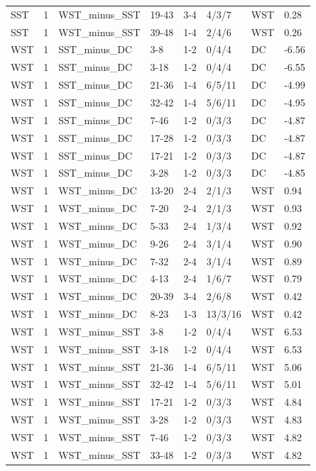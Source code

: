 \begin{table}[!h]
\begin{tabular}[t]{lrllllll}
SST & 1 & WST_minus_SST & 19-43 & 3-4 & 4/3/7 & WST & 0.28\\
SST & 1 & WST_minus_SST & 39-48 & 1-4 & 2/4/6 & WST & 0.26\\
WST & 1 & SST_minus_DC & 3-8 & 1-2 & 0/4/4 & DC & -6.56\\
\addlinespace
WST & 1 & SST_minus_DC & 3-18 & 1-2 & 0/4/4 & DC & -6.55\\
WST & 1 & SST_minus_DC & 21-36 & 1-4 & 6/5/11 & DC & -4.99\\
WST & 1 & SST_minus_DC & 32-42 & 1-4 & 5/6/11 & DC & -4.95\\
WST & 1 & SST_minus_DC & 7-46 & 1-2 & 0/3/3 & DC & -4.87\\
WST & 1 & SST_minus_DC & 17-28 & 1-2 & 0/3/3 & DC & -4.87\\
\addlinespace
WST & 1 & SST_minus_DC & 17-21 & 1-2 & 0/3/3 & DC & -4.87\\
WST & 1 & SST_minus_DC & 3-28 & 1-2 & 0/3/3 & DC & -4.85\\
WST & 1 & WST_minus_DC & 13-20 & 2-4 & 2/1/3 & WST & 0.94\\
WST & 1 & WST_minus_DC & 7-20 & 2-4 & 2/1/3 & WST & 0.93\\
WST & 1 & WST_minus_DC & 5-33 & 2-4 & 1/3/4 & WST & 0.92\\
\addlinespace
WST & 1 & WST_minus_DC & 9-26 & 2-4 & 3/1/4 & WST & 0.90\\
WST & 1 & WST_minus_DC & 7-32 & 2-4 & 3/1/4 & WST & 0.89\\
WST & 1 & WST_minus_DC & 4-13 & 2-4 & 1/6/7 & WST & 0.79\\
WST & 1 & WST_minus_DC & 20-39 & 3-4 & 2/6/8 & WST & 0.42\\
WST & 1 & WST_minus_DC & 8-23 & 1-3 & 13/3/16 & WST & 0.42\\
\addlinespace
WST & 1 & WST_minus_SST & 3-8 & 1-2 & 0/4/4 & WST & 6.53\\
WST & 1 & WST_minus_SST & 3-18 & 1-2 & 0/4/4 & WST & 6.53\\
WST & 1 & WST_minus_SST & 21-36 & 1-4 & 6/5/11 & WST & 5.06\\
WST & 1 & WST_minus_SST & 32-42 & 1-4 & 5/6/11 & WST & 5.01\\
WST & 1 & WST_minus_SST & 17-21 & 1-2 & 0/3/3 & WST & 4.84\\
\addlinespace
WST & 1 & WST_minus_SST & 3-28 & 1-2 & 0/3/3 & WST & 4.83\\
WST & 1 & WST_minus_SST & 7-46 & 1-2 & 0/3/3 & WST & 4.82\\
WST & 1 & WST_minus_SST & 33-48 & 1-2 & 0/3/3 & WST & 4.82\\

\end{tabular}
\end{table}
